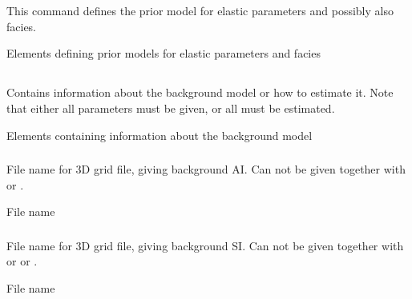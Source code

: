 
\section{}
 \slist
   \item \Description This command defines the prior model for elastic parameters and possibly also facies.
   \item \Argument Elements defining prior models for elastic parameters and facies
   \item \Default
 \elist

\subsection{}
 \slist
   \item \Description Contains information about the background model or how to estimate it. Note that either all parameters must be given, or all must be estimated.
   \item \Argument Elements containing information about the background model
   \item \Default
 \elist

\subsubsection{}
 \slist
   \item \Description File name for 3D grid file, giving background
   AI. Can not be given together with  or .
   \item \Argument File name
   \item \Default
 \elist

\subsubsection{}
 \slist
   \item \Description File name for 3D grid file, giving background
   SI. Can not be given together with  or 
   or .
   \item \Argument File name
   \item \Default
 \elist

